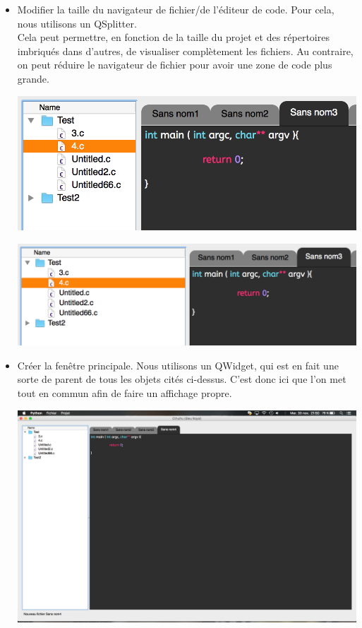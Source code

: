 \documentclass[a4paper,12pt]{article}
\begin{document}
\begin{itemize}
			\item Modifier la taille du navigateur de fichier/de l'éditeur de code. Pour cela, nous utilisons un QSplitter.\\ 
			Cela peut permettre, en fonction de la taille du projet et des répertoires imbriqués dans d'autres, de visualiser complètement les fichiers. Au contraire, on peut réduire le navigateur de fichier pour avoir une zone de code plus grande.\\
			
			\begin{center}
				\includegraphics[scale=0.6]{images/QSplitter_1}
				\vspace{0.6cm}
			\end{center}

			\begin{center}
				\includegraphics[scale=0.6]{images/QSplitter_2}
				\vspace{0.6cm}
			\end{center}
			
			\item Créer la fenêtre principale. Nous utilisons un QWidget, qui est en fait une sorte de parent de tous les objets cités ci-dessus. C'est donc ici que l'on met tout en commun afin de faire un affichage propre.
			\begin{center}
				\includegraphics[scale=0.3]{images/QWidget}
				\vspace{0.6cm}
			\end{center}
			

\end{itemize}
\end{document}
